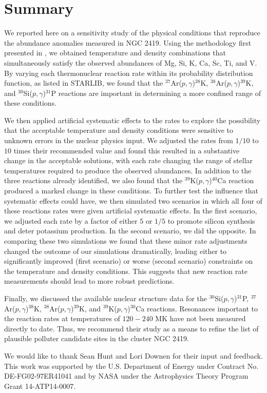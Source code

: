 \documentclass[twocolumn]{aastex6}
\newcommand{\nuclei}[2]{$^{#1}${#2}}
\newcommand{\pgreaction}[4]{\nuclei{#1}{#2}($p,\gamma$)\nuclei{#3}{#4}}
\begin{document}
\section{Summary}
We reported here on a sensitivity study of the physical conditions that reproduce the abundance anomalies measured in NGC 2419. 
Using the methodology first presented in \citet{Iliadis_2016}, we obtained temperature and density combinations that simultaneously satisfy the observed abundances of Mg, Si, K, Ca, Sc, Ti, and V.
By varying each thermonuclear reaction rate within its probability distribution function, as listed in STARLIB, we found that the \pgreaction{37}{Ar}{38}{K}, \pgreaction{38}{Ar}{39}{K}, and \pgreaction{30}{Si}{31}{P} reactions are important in determining a more confined range of these conditions.  
\par
We then applied artificial systematic effects to the rates to explore the possibility that the acceptable temperature and density conditions were sensitive to unknown errors in the nuclear physics input.
We adjusted the rates from $1/10$ to $10$ times their recommended value and found this resulted in a substantive change in the acceptable solutions, with each rate changing the range of stellar temperatures required to produce the observed abundances.
In addition to the three reactions already identified, we also found that the \pgreaction{39}{K}{40}{Ca} reaction produced a marked change in these conditions.
To further test the influence that systematic effects could have, we then simulated two scenarios in which all four of these reactions rates were given artificial systematic effects.
In the first scenario, we adjusted each rate by a factor of either $5$ or $1/5$ to promote silicon synthesis and deter potassium production. In the second scenario, we did the opposite.
In comparing these two simulations we found that these minor rate adjustments changed the outcome of our simulations dramatically, leading either to significantly improved (first scenario) or worse (second scenario) constraints on the temperature and density conditions.
This suggests that new reaction rate measurements should lead to more robust predictions.
\par
Finally, we discussed the available nuclear structure data for the \pgreaction{30}{Si}{31}{P}, \pgreaction{37}{Ar}{38}{K}, \pgreaction{38}{Ar}{39}{K}, and \pgreaction{39}{K}{30}{Ca} reactions. Resonances important to the reaction rates at temperatures of $120-240$ MK have not been measured directly to date. Thus, we recommend their study as a means to refine the list of plausible polluter candidate sites in the cluster NGC 2419.

\acknowledgments
We would like to thank Sean Hunt and Lori Downen for their input and feedback.
This work was supported by the U.S. Department of Energy under Contract No. DE-FG02-97ER41041 and by NASA under the Astrophysics Theory Program Grant 14-ATP14-0007.


\newpage 



\end{document}
